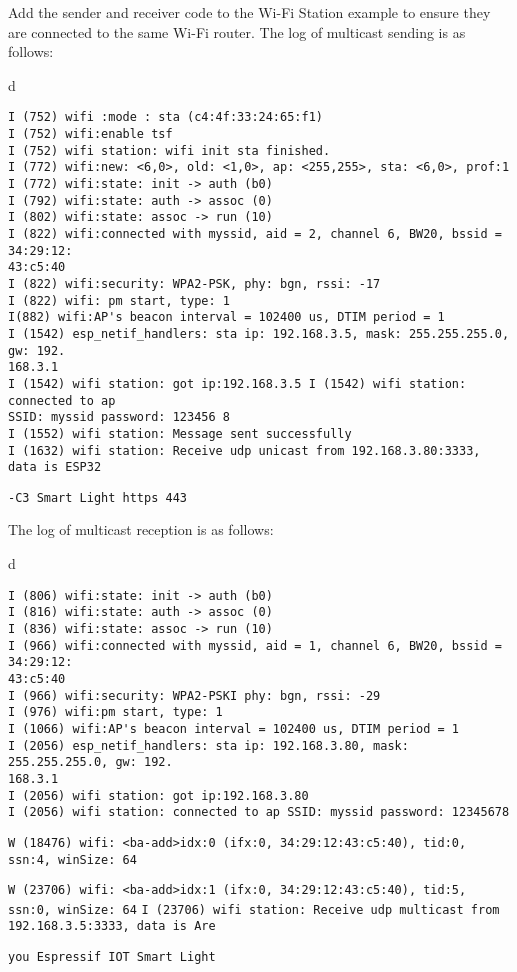 \documentclass[a4paper,12pt]{book}
\begin{document}
\vspace{6pt}
Add the sender and receiver code to the Wi-Fi Station example to ensure they are connected to the same Wi-Fi router. The log of multicast sending is as follows:

\begin{codebloc}
\begin{tabular}{d}
\vspace{2pt}
\begin{verbatim}
I (752) wifi :mode : sta (c4:4f:33:24:65:f1) 
I (752) wifi:enable tsf 
I (752) wifi station: wifi init sta finished. 
I (772) wifi:new: <6,0>, old: <1,0>, ap: <255,255>, sta: <6,0>, prof:1 
I (772) wifi:state: init -> auth (b0) 
I (792) wifi:state: auth -> assoc (0)
I (802) wifi:state: assoc -> run (10) 
I (822) wifi:connected with myssid, aid = 2, channel 6, BW20, bssid = 34:29:12:
43:c5:40 
I (822) wifi:security: WPA2-PSK, phy: bgn, rssi: -17 
I (822) wifi: pm start, type: 1 
I(882) wifi:AP's beacon interval = 102400 us, DTIM period = 1 
I (1542) esp_netif_handlers: sta ip: 192.168.3.5, mask: 255.255.255.0, gw: 192.
168.3.1 
I (1542) wifi station: got ip:192.168.3.5 I (1542) wifi station: connected to ap 
SSID: myssid password: 123456 8 
I (1552) wifi station: Message sent successfully 
I (1632) wifi station: Receive udp unicast from 192.168.3.80:3333, data is ESP32
\end{verbatim}
\verb|-C3 Smart Light https 443|
\end{tabular}
\end{codebloc}

\vspace{6pt}
The log of multicast reception is as follows:

\begin{codebloc}
\begin{tabular}{d}
\vspace{2pt}
\begin{verbatim}
I (806) wifi:state: init -> auth (b0)
I (816) wifi:state: auth -> assoc (0) 
I (836) wifi:state: assoc -> run (10)
I (966) wifi:connected with myssid, aid = 1, channel 6, BW20, bssid = 34:29:12:
43:c5:40
I (966) wifi:security: WPA2-PSKI phy: bgn, rssi: -29
I (976) wifi:pm start, type: 1 
I (1066) wifi:AP's beacon interval = 102400 us, DTIM period = 1
I (2056) esp_netif_handlers: sta ip: 192.168.3.80, mask: 255.255.255.0, gw: 192.
168.3.1 
I (2056) wifi station: got ip:192.168.3.80 
I (2056) wifi station: connected to ap SSID: myssid password: 12345678 
\end{verbatim}
\fontsize{9.5pt}{10pt}\selectfont
\verb|W (18476) wifi: <ba-add>idx:0 (ifx:0, 34:29:12:43:c5:40), tid:0, ssn:4, winSize: 64|

\verb|W (23706) wifi: <ba-add>idx:1 (ifx:0, 34:29:12:43:c5:40), tid:5, ssn:0, winSize: 64|
\footnotesize
\verb|I (23706) wifi station: Receive udp multicast from 192.168.3.5:3333, data is Are |

\verb|you Espressif IOT Smart Light|
\end{tabular}
\end{codebloc}
\end{document}
